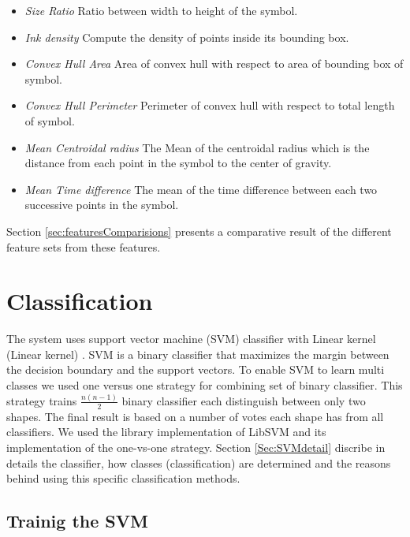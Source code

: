  	\begin{itemize}
\item \emph{Size Ratio} Ratio between width to height of the symbol.
	\item \emph{Ink density} Compute the density of points inside its bounding box\cite{GeometryAndDomain102}.   
 	\item \emph{Convex Hull Area} Area of convex hull with respect to area of bounding box of symbol.
	\item \emph{Convex Hull Perimeter} Perimeter of convex hull with respect to total length of symbol.
		\item \emph{Mean Centroidal radius} The Mean of the centroidal radius which is the distance from each point in the symbol to the center of gravity.
	
	\item \emph{Mean Time difference} The mean of the time difference between each two successive points in the symbol. %
  \end{itemize}
  
 Section \ref{sec:featuresComparisions} presents a comparative result of the different feature sets from these features.

\section{Classification}%
\label{sec:Classification}
The system uses support vector machine (SVM) classifier with Linear kernel (Linear kernel) \cite{libsvm}. SVM is a binary classifier that maximizes the margin between the decision boundary and the support vectors. To enable SVM to learn multi classes we used one versus one strategy for combining set of binary classifier. This strategy trains $ \frac{n(n-1)}{{2}}$ binary classifier each distinguish between only two shapes. The final result is based on a number of votes each shape has from all classifiers. We used the library implementation of LibSVM \cite{libsvm} and its implementation of the one-vs-one strategy. Section \ref{Sec:SVMdetail} discribe in details the classifier, how classes (classification) are determined and the reasons behind using this specific classification methods.

\subsection {Trainig the SVM}
